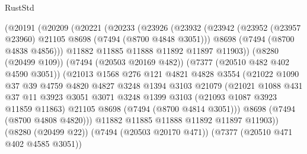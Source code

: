 \begin{lexlean}{RustStd}
\begin{coremodule}
                    (@20191
                      (@20209
                        (@20221
                          (@20233
                            (@23926
                              (@23932
                                (@23942
                                  (@23952 (@23957 @23960) @21105 @8698 (@7494 (@8700 @4848 @3051)))
                                  @8698
                                  (@7494 (@8700 @4838 @4856)))
                                @11882
                                @11885
                                @11888
                                @11892
                                @11897
                                @11903))
                            (@8280 (@20499 @109))
                            (@7494 (@20503 @20169 @482))
                            (@7377 (@20510 @482 @402 @4590 @3051))
                            (@21013
                              @1568
                              @276
                              @121
                              @4821
                              @4828
                              @3554
                              (@21022
                                @1090
                                @37
                                @39
                                @4759
                                @4820
                                @4827
                                @3248
                                @1394
                                @3103
                                @21079
                                (@21021
                                  @1088
                                  @431
                                  @37
                                  @11
                                  @3923
                                  @3051
                                  @3071
                                  @3248
                                  @1399
                                  @3103
                                  (@21093 @1087 @3923 @11859 @11863)
                                  @21105
                                  @8698
                                  (@7494 (@8700 @4814 @3051)))
                                @8698
                                (@7494 (@8700 @4808 @4820)))
                              @11882
                              @11885
                              @11888
                              @11892
                              @11897
                              @11903))
                          (@8280 (@20499 @22))
                          (@7494 (@20503 @20170 @471))
                          (@7377 (@20510 @471 @402 @4585 @3051))

\end{coremodule}
\end{lexlean}
